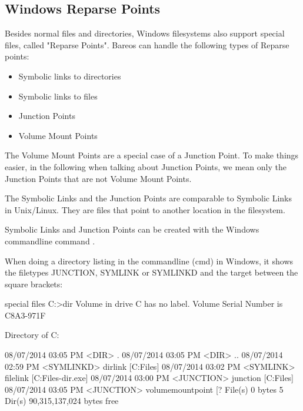 \subsection{Windows Reparse Points}


Besides normal files and directories, Windows filesystems also support special files, called "Reparse Points".
Bareos can handle the following types of Reparse points:
\begin{itemize}
    \item Symbolic links to directories
    \item Symbolic links to files
    \item Junction Points
    \item Volume Mount Points
\end{itemize}

The Volume Mount Points are a special case of a Junction Point. To make things easier, in the following when talking about Junction Points, we mean only the Junction Points that are not Volume Mount Points.

The Symbolic Links and the Junction Points are comparable to Symbolic Links in Unix/Linux. They are files that point to another location in the filesystem.

Symbolic Links and Junction Points can be created with the Windows commandline command .

When doing a directory listing in the commandline (cmd) in Windows, 
it shows the filetypes JUNCTION, SYMLINK or SYMLINKD and the target between the square brackets:

\begin{commands}{special files}
C:\linktest>dir
 Volume in drive C has no label.
 Volume Serial Number is C8A3-971F

 Directory of C:\linktest

08/07/2014  03:05 PM    <DIR>          .
08/07/2014  03:05 PM    <DIR>          ..
08/07/2014  02:59 PM    <SYMLINKD>     dirlink [C:\Program Files\Bareos]
08/07/2014  03:02 PM    <SYMLINK>      filelink [C:\Program Files\Bareos\bareos-dir.exe]
08/07/2014  03:00 PM    <JUNCTION>     junction [C:\Program Files\Bareos]
08/07/2014  03:05 PM    <JUNCTION>     volumemountpoint [\?? File(s)              0 bytes
               5 Dir(s)  90,315,137,024 bytes free
\end{commands}

